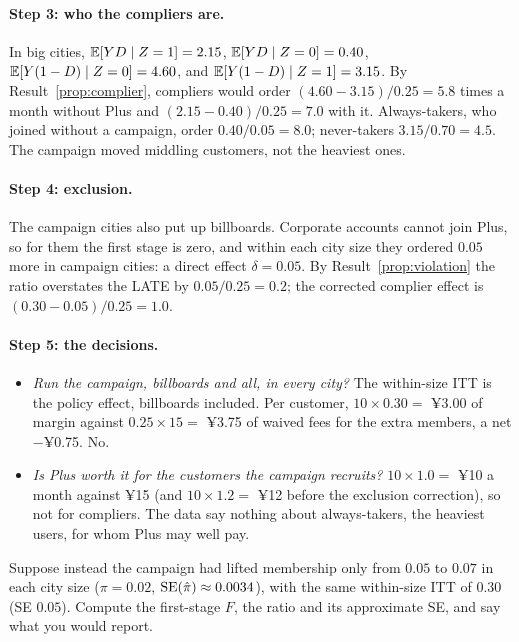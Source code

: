 \documentclass[11pt]{article}
\begin{document}
\paragraph{Step 3: who the compliers are.} In big cities, $\mathbb{E}[YD \mid Z=1] = 2.15$, $\mathbb{E}[YD \mid Z=0] = 0.40$,
$\mathbb{E}[Y(1-D) \mid Z=0] = 4.60$, and $\mathbb{E}[Y(1-D) \mid Z=1] = 3.15$. By Result~\ref{prop:complier}, compliers would order
$(4.60 - 3.15)/0.25 = 5.8$ times a month without Plus and $(2.15 - 0.40)/0.25 = 7.0$ with it. Always-takers, who joined
without a campaign, order $0.40/0.05 = 8.0$; never-takers $3.15/0.70 = 4.5$. The campaign moved middling customers, not the
heaviest ones.

\paragraph{Step 4: exclusion.} The campaign cities also put up billboards. Corporate accounts cannot join Plus, so for them the
first stage is zero, and within each city size they ordered $0.05$ more in campaign cities: a direct effect $\delta = 0.05$.
By Result~\ref{prop:violation} the ratio overstates the LATE by $0.05/0.25 = 0.2$; the corrected complier effect is
$(0.30 - 0.05)/0.25 = 1.0$.

\paragraph{Step 5: the decisions.}
\begin{itemize}
  \item \emph{Run the campaign, billboards and all, in every city?} The within-size ITT is the policy effect, billboards
  included. Per customer, $10 \times 0.30 = $ ¥3.00 of margin against $0.25 \times 15 = $ ¥3.75 of waived fees for the extra
  members, a net $-$¥0.75. No.
  \item \emph{Is Plus worth it for the customers the campaign recruits?} $10 \times 1.0 = $ ¥10 a month against ¥15 (and
  $10 \times 1.2 = $ ¥12 before the exclusion correction), so not for compliers. The data say nothing about always-takers, the
  heaviest users, for whom Plus may well pay.
\end{itemize}

\begin{exercise}[computation]
Suppose instead the campaign had lifted membership only from $0.05$ to $0.07$ in each city size ($\pi = 0.02$, $\operatorname{SE}(\hat\pi) \approx 0.0034$),
with the same within-size ITT of $0.30$ (SE $0.05$). Compute the first-stage $F$, the ratio and its approximate SE, and say what you would
report.
\end{exercise}
\end{document}
